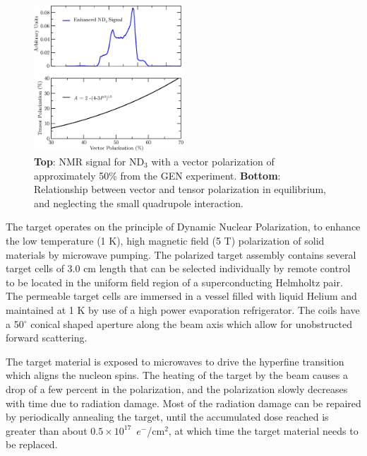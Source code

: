 \begin{figure}
\centering
\includegraphics[width=0.5\textwidth]{figs/tensor_pol3.eps}
\caption{{\bf Top}: NMR signal for ND$_3$ with a vector polarization of approximately 50\% from the GEN experiment.  %
{\bf Bottom}: Relationship between vector and tensor polarization in equilibrium, and 
neglecting the small quadrupole interaction.  \label{fig:tensorpol}}
\end{figure}



The target operates on the principle of Dynamic Nuclear Polarization, to
enhance the low temperature (1 K), high magnetic field (5 T) polarization of solid
materials  by microwave pumping.
The polarized target assembly contains several target cells of 3.0 cm length
that can be  selected individually by remote control to be located in the uniform field
region of a superconducting Helmholtz pair. The permeable target cells are
immersed in a  vessel filled with liquid Helium and maintained at 1 K by use of a
high power evaporation refrigerator.
The coils have a 50$^\circ$ conical shaped aperture along the beam axis
which allow for unobstructed forward scattering.

The target material is exposed to microwaves
to drive the hyperfine transition which  aligns the nucleon spins. 
 The heating of the target by the beam causes a drop of a few percent in
the polarization, and the polarization slowly decreases with time due to radiation
damage. Most of the radiation damage can be repaired by periodically annealing the target,
until the accumulated dose reached is greater than about 
 $0.5\times 10^{17}$~$e^-$/cm$^2$,
at
which time the target material needs to be replaced. 

